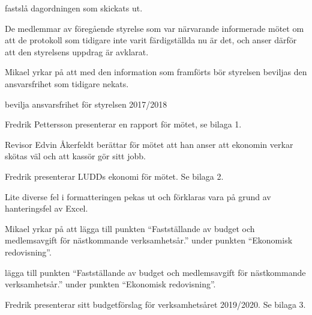 \documentclass{protokoll}
\begin{document}
\newpage  


\begin{beslut}
     \att fastslå dagordningen som skickats ut.
\end{beslut}

De medlemmar av föregående styrelse som var närvarande informerade mötet om att
de protokoll som tidigare inte varit färdigställda nu är det, och anser därför
att den styrelsens uppdrag är avklarat. 

Mikael yrkar på att med den information som framförts bör styrelsen beviljas
den ansvarsfrihet som tidigare nekats. 

\begin{beslut}
  \att bevilja ansvarsfrihet för styrelsen 2017/2018
\end{beslut}

Fredrik Pettersson presenterar en rapport för mötet, se bilaga 1.

Revisor Edvin Åkerfeldt berättar för mötet att han anser att ekonomin verkar
skötas väl och att kassör gör sitt jobb. 

Fredrik presenterar LUDDs ekonomi för mötet. Se bilaga 2. 

Lite diverse fel i formatteringen pekas ut och förklaras vara på grund av
hanteringsfel av Excel. 

Mikael yrkar på att lägga till punkten ``Fastställande av budget och medlemsavgift för nästkommande
verksamhetsår.'' under punkten ``Ekonomisk redovisning''. 
\begin{beslut}
\att lägga till punkten ``Fastställande av budget och medlemsavgift för nästkommande
verksamhetsår.'' under punkten ``Ekonomisk redovisning''.
\end{beslut}
Fredrik presenterar sitt budgetförslag för verksamhetsåret 2019/2020. Se bilaga
3.
\end{document}
